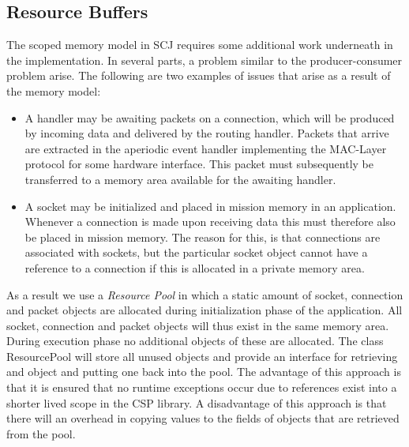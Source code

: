 \subsection{Resource Buffers}
The scoped memory model in SCJ requires some additional work underneath in the implementation. In several parts, a problem similar to the producer-consumer problem arise. The following are two examples of issues that arise as a result of the memory model:
\begin{itemize}
	\item A handler may be awaiting packets on a connection, which will be produced by incoming data and delivered by the routing handler. Packets that arrive are extracted in the aperiodic event handler implementing the MAC-Layer protocol for some hardware interface. This packet must subsequently be transferred to a memory area available for the awaiting handler.
	\item A socket may be initialized and placed in mission memory in an application. Whenever a connection is made upon receiving data this must therefore also be placed in mission memory. The reason for this, is that connections are associated with sockets, but the particular socket object cannot have a reference to a connection if this is allocated in a private memory area.
\end{itemize}

As a result we use a \textit{Resource Pool}\cite{Rios:2012:PSJ:2388936.2388938} in which a static amount of socket, connection and packet objects are allocated during initialization phase of the application. All socket, connection and packet objects will thus exist in the same memory area. During execution phase no additional objects of these are allocated. The class ResourcePool will store all unused objects and provide an interface for retrieving and object and putting one back into the pool. The advantage of this approach is that it is ensured that no runtime exceptions occur due to references exist into a shorter lived scope in the CSP library. A disadvantage of this approach is that there will an overhead in copying values to the fields of objects that are retrieved from the pool. 